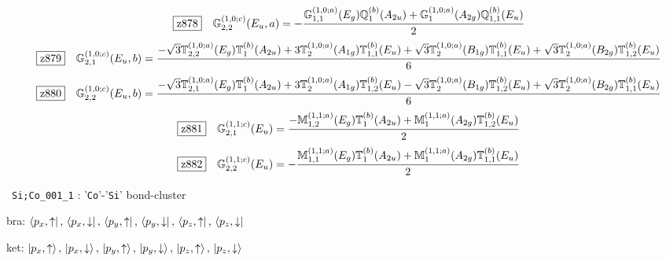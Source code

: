 \documentclass[fleqn,10pt,landscape]{jsarticle}
\begin{document}
\begin{dmath*}
\hspace*{3mm}\fbox{z878}\quad \mathbb{G}_{2,2}^{(1,0;c)}(E_{u},a)=- \frac{\mathbb{G}_{1,1}^{(1,0;a)}(E_{g}) \mathbb{Q}_{1}^{(b)}(A_{2u}) + \mathbb{G}_{1}^{(1,0;a)}(A_{2g}) \mathbb{Q}_{1,1}^{(b)}(E_{u})}{2}
\end{dmath*}
\begin{dmath*}
\hspace*{3mm}\fbox{z879}\quad \mathbb{G}_{2,1}^{(1,0;c)}(E_{u},b)=\frac{- \sqrt{3} \mathbb{T}_{2,2}^{(1,0;a)}(E_{g}) \mathbb{T}_{1}^{(b)}(A_{2u}) + 3 \mathbb{T}_{2}^{(1,0;a)}(A_{1g}) \mathbb{T}_{1,1}^{(b)}(E_{u}) + \sqrt{3} \mathbb{T}_{2}^{(1,0;a)}(B_{1g}) \mathbb{T}_{1,1}^{(b)}(E_{u}) + \sqrt{3} \mathbb{T}_{2}^{(1,0;a)}(B_{2g}) \mathbb{T}_{1,2}^{(b)}(E_{u})}{6}
\end{dmath*}
\begin{dmath*}
\hspace*{3mm}\fbox{z880}\quad \mathbb{G}_{2,2}^{(1,0;c)}(E_{u},b)=\frac{- \sqrt{3} \mathbb{T}_{2,1}^{(1,0;a)}(E_{g}) \mathbb{T}_{1}^{(b)}(A_{2u}) + 3 \mathbb{T}_{2}^{(1,0;a)}(A_{1g}) \mathbb{T}_{1,2}^{(b)}(E_{u}) - \sqrt{3} \mathbb{T}_{2}^{(1,0;a)}(B_{1g}) \mathbb{T}_{1,2}^{(b)}(E_{u}) + \sqrt{3} \mathbb{T}_{2}^{(1,0;a)}(B_{2g}) \mathbb{T}_{1,1}^{(b)}(E_{u})}{6}
\end{dmath*}
\begin{dmath*}
\hspace*{3mm}\fbox{z881}\quad \mathbb{G}_{2,1}^{(1,1;c)}(E_{u})=\frac{- \mathbb{M}_{1,2}^{(1,1;a)}(E_{g}) \mathbb{T}_{1}^{(b)}(A_{2u}) + \mathbb{M}_{1}^{(1,1;a)}(A_{2g}) \mathbb{T}_{1,2}^{(b)}(E_{u})}{2}
\end{dmath*}
\begin{dmath*}
\hspace*{3mm}\fbox{z882}\quad \mathbb{G}_{2,2}^{(1,1;c)}(E_{u})=- \frac{\mathbb{M}_{1,1}^{(1,1;a)}(E_{g}) \mathbb{T}_{1}^{(b)}(A_{2u}) + \mathbb{M}_{1}^{(1,1;a)}(A_{2g}) \mathbb{T}_{1,1}^{(b)}(E_{u})}{2}
\end{dmath*}
\vspace{5mm}

\noindent\textbullet\, \texttt{Si;Co_001_1} : '\texttt{Co}'-'\texttt{Si}' bond-cluster

\noindent\quad * bra: $\bra{p_{x},\uparrow},\, \bra{p_{x},\downarrow},\, \bra{p_{y},\uparrow},\, \bra{p_{y},\downarrow},\, \bra{p_{z},\uparrow},\, \bra{p_{z},\downarrow}$

\noindent\quad * ket: $\ket{p_{x},\uparrow},\, \ket{p_{x},\downarrow},\, \ket{p_{y},\uparrow},\, \ket{p_{y},\downarrow},\, \ket{p_{z},\uparrow},\, \ket{p_{z},\downarrow}$
\end{document}
